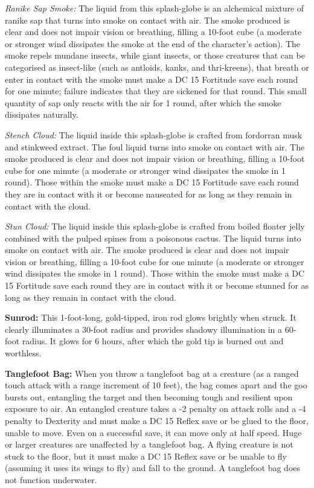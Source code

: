  \textit{Ranike Sap Smoke:} The liquid from this splash-globe is an alchemical mixture of ranike sap that turns into smoke on contact with air. The smoke produced is clear and does not impair vision or breathing, filling a 10-foot cube (a moderate or stronger wind dissipates the smoke at the end of the character's action). The smoke repels mundane insects, while giant insects, or those creatures that can be categorised as insect-like (such as antloids, kanks, and thri-kreens), that breath or enter in contact with the smoke must make a DC 15 Fortitude save each round for one minute; failure indicates that they are sickened for that round. This small quantity of sap only reacts with the air for 1 round, after which the smoke dissipates naturally.

 \textit{Stench Cloud:} The liquid inside this splash-globe is crafted from fordorran musk and stinkweed extract. The foul liquid turns into smoke on contact with air. The smoke produced is clear and does not impair vision or breathing, filling a 10-foot cube for one minute (a moderate or stronger wind dissipates the smoke in 1 round). Those within the smoke must make a DC 15 Fortitude save each round they are in contact with it or become nauseated for as long as they remain in contact with the cloud.

 \textit{Stun Cloud:} The liquid inside this splash-globe is crafted from boiled floater jelly combined with the pulped spines from a poisonous cactus. The liquid turns into smoke on contact with air. The smoke produced is clear and does not impair vision or breathing, filling a 10-foot cube for one minute (a moderate or stronger wind dissipates the smoke in 1 round). Those within the smoke must make a DC 15 Fortitude save each round they are in contact with it or become stunned for as long as they remain in contact with the cloud.

\textbf{Sunrod:} This 1-foot-long, gold-tipped, iron rod glows brightly when struck. It clearly illuminates a 30-foot radius and provides shadowy illumination in a 60-foot radius. It glows for 6 hours, after which the gold tip is burned out and worthless.

\textbf{Tanglefoot Bag:} When you throw a tanglefoot bag at a creature (as a ranged touch attack with a range increment of 10 feet), the bag comes apart and the goo bursts out, entangling the target and then becoming tough and resilient upon exposure to air. An entangled creature takes a -2 penalty on attack rolls and a -4 penalty to Dexterity and must make a DC 15 Reflex save or be glued to the floor, unable to move. Even on a successful save, it can move only at half speed. Huge or larger creatures are unaffected by a tanglefoot bag. A flying creature is not stuck to the floor, but it must make a DC 15 Reflex save or be unable to fly (assuming it uses its wings to fly) and fall to the ground. A tanglefoot bag does not function underwater.

